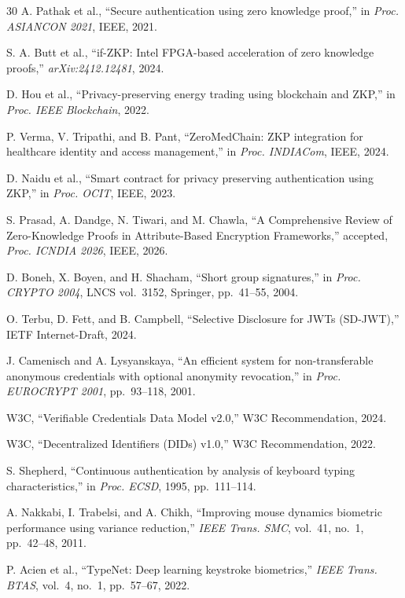 \documentclass[12pt,a4paper,oneside]{report}
\begin{document}
\begin{thebibliography}{30}
A. Pathak et al., ``Secure authentication using zero knowledge proof,''
in \textit{Proc. ASIANCON 2021}, IEEE, 2021.

S. A. Butt et al., ``if-ZKP: Intel FPGA-based acceleration of zero knowledge
proofs,'' \textit{arXiv:2412.12481}, 2024.

D. Hou et al., ``Privacy-preserving energy trading using blockchain and ZKP,''
in \textit{Proc. IEEE Blockchain}, 2022.

P. Verma, V. Tripathi, and B. Pant, ``ZeroMedChain: ZKP integration for healthcare
identity and access management,'' in \textit{Proc. INDIACom}, IEEE, 2024.

D. Naidu et al., ``Smart contract for privacy preserving authentication using ZKP,''
in \textit{Proc. OCIT}, IEEE, 2023.

S. Prasad, A. Dandge, N. Tiwari, and M. Chawla, ``A Comprehensive Review of
Zero-Knowledge Proofs in Attribute-Based Encryption Frameworks,'' accepted,
\textit{Proc. ICNDIA 2026}, IEEE, 2026.

D. Boneh, X. Boyen, and H. Shacham, ``Short group signatures,'' in
\textit{Proc. CRYPTO 2004}, LNCS vol.~3152, Springer, pp.~41--55, 2004.

O. Terbu, D. Fett, and B. Campbell, ``Selective Disclosure for JWTs (SD-JWT),''
IETF Internet-Draft, 2024.

J. Camenisch and A. Lysyanskaya, ``An efficient system for non-transferable anonymous
credentials with optional anonymity revocation,'' in \textit{Proc. EUROCRYPT 2001},
pp.~93--118, 2001.

W3C, ``Verifiable Credentials Data Model v2.0,'' W3C Recommendation, 2024.

W3C, ``Decentralized Identifiers (DIDs) v1.0,'' W3C Recommendation, 2022.

S. Shepherd, ``Continuous authentication by analysis of keyboard typing
characteristics,'' in \textit{Proc. ECSD}, 1995, pp.~111--114.

A. Nakkabi, I. Trabelsi, and A. Chikh, ``Improving mouse dynamics biometric
performance using variance reduction,'' \textit{IEEE Trans. SMC}, vol.~41, no.~1,
pp.~42--48, 2011.

P. Acien et al., ``TypeNet: Deep learning keystroke biometrics,''
\textit{IEEE Trans. BTAS}, vol.~4, no.~1, pp.~57--67, 2022.


\end{thebibliography}
\end{document}
